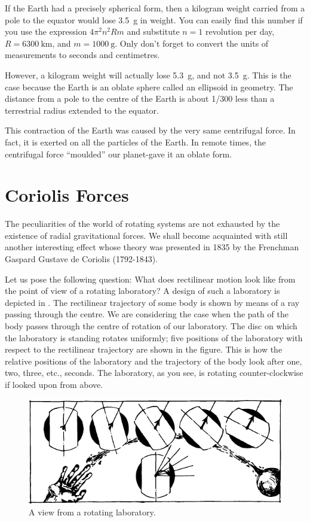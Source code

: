 If the Earth had a precisely spherical form, then a kilogram weight carried from a pole to the equator would lose \SI{3.5}{\gram} in weight. You can easily find this number if you use the expression $4\pi^{2}n^{2}Rm$ and substitute $n = 1$ revolution per day, $R = \SI{6300}{\kilo\meter}$, and $m = \SI{1000}{\gram}$. Only don't forget to convert the units of measurements to seconds and centimetres.

However, a kilogram weight will actually lose \SI{5.3}{\gram},
and not \SI{3.5}{\gram}. This is the case because the Earth is an
oblate sphere called an ellipsoid in geometry. The distance
from a pole to the centre of the Earth is about 1/300 less
than a terrestrial radius extended to the equator. 

This contraction of the Earth was caused by the very same centrifugal force. In fact, it is exerted on all the particles of the Earth. In remote times, the centrifugal force ``moulded'' our planet-gave it an oblate form.

\section{Coriolis Forces}
The peculiarities of the world of rotating systems are
not exhausted by the existence of radial gravitational
forces. We shall become acquainted with still another
interesting effect whose theory was presented in 1835
by the Frenchman Gaspard Gustave de Coriolis (1792-1843).

Let us pose the following question: What does rectilinear motion look like from the point of view of a rotating laboratory? A design of such a laboratory is depicted
in . The rectilinear trajectory of some body is
shown by means of a ray passing through the centre. We
are considering the case when the path of the body passes
through the centre of rotation of our laboratory. The
disc on which the laboratory is standing rotates uniformly; five positions of the laboratory with respect to the
rectilinear trajectory are shown in the figure. This is
how the relative positions of the laboratory and the
trajectory of the body look after one, two, three, etc.,
seconds. The laboratory, as you see, is rotating counter-clockwise if looked upon from above.

\begin{figure}[!ht]
\centering
\includegraphics[width=\textwidth]{figures/fig-02-14.pdf}
\caption{A view from a rotating laboratory.}
\label{fig-2.14}
\end{figure}

